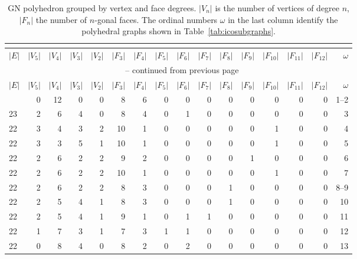 \footnotesize{\begin{longtable}{l@{\hskip 4pt}r@{\hskip 4pt}r@{\hskip 4pt}r@{\hskip 4pt}r@{\hskip 4pt}r@{\hskip 4pt}r@{\hskip 4pt}r@{\hskip 4pt}r@{\hskip 4pt}r@{\hskip 4pt}r@{\hskip 4pt}r@{\hskip 4pt}r@{\hskip 4pt}r@{\hskip 4pt}r@{\hskip 8pt}r}
    \caption{GN polyhedron grouped by vertex and face degrees. $|V_n|$ is the
    number of vertices of degree $n$, $|F_n|$ the number of $n$-gonal faces.
    The ordinal numbers $\omega$ in the last column identify the polyhedral
    graphs shown in Table~\ref{tab:icosubgraphs}.}\\
    \label{tab:verticesandfaces}\\
\toprule    
    $|E|$ & $|V_5|$ & $|V_4|$ & $|V_3|$ & $|V_2|$ & $|F_3|$ & $|F_4|$ & $|F_5|$ & $|F_6|$ & $|F_7|$ & $|F_8|$ & $|F_9|$ & $|F_{10}|$ & $|F_{11}|$ & $|F_{12}|$ & $\omega$ \\\midrule
\endfirsthead
\multicolumn{16}{c}{\tablename~\thetable{} -- continued from previous page}\\
\toprule
    $|E|$ & $|V_5|$ & $|V_4|$ & $|V_3|$ & $|V_2|$ & $|F_3|$ & $|F_4|$ & $|F_5|$ & $|F_6|$ & $|F_7|$ & $|F_8|$ & $|F_9|$ & $|F_{10}|$ & $|F_{11}|$ & $|F_{12}|$ & $\omega$ \\\midrule
\endhead
\bottomrule\endfoot
    24 & 0  & 12 & 0  & 0  & 8  & 6  & 0  & 0  & 0  & 0  & 0  & 0  & 0  & 0  & 1--2\\
    23 & 2  & 6  & 4  & 0  & 8  & 4  & 0  & 1  & 0  & 0  & 0  & 0  & 0  & 0  & 3  \\
    22 & 3  & 4  & 3  & 2  & 10 & 1  & 0  & 0  & 0  & 0  & 0  & 1  & 0  & 0  & 4  \\
    22 & 3  & 3  & 5  & 1  & 10 & 1  & 0  & 0  & 0  & 0  & 0  & 1  & 0  & 0  & 5  \\
    22 & 2  & 6  & 2  & 2  & 9  & 2  & 0  & 0  & 0  & 0  & 1  & 0  & 0  & 0  & 6  \\
    22 & 2  & 6  & 2  & 2  & 10 & 1  & 0  & 0  & 0  & 0  & 0  & 1  & 0  & 0  & 7  \\
    22 & 2  & 6  & 2  & 2  & 8  & 3  & 0  & 0  & 0  & 1  & 0  & 0  & 0  & 0  & 8--9\\
    22 & 2  & 5  & 4  & 1  & 8  & 3  & 0  & 0  & 0  & 1  & 0  & 0  & 0  & 0  & 10 \\
    22 & 2  & 5  & 4  & 1  & 9  & 1  & 0  & 1  & 1  & 0  & 0  & 0  & 0  & 0  & 11\\
    22 & 1  & 7  & 3  & 1  & 7  & 3  & 1  & 1  & 0  & 0  & 0  & 0  & 0  & 0  & 12 \\
    22 & 0  & 8  & 4  & 0  & 8  & 2  & 0  & 2  & 0  & 0  & 0  & 0  & 0  & 0  & 13\\

\end{longtable}}
